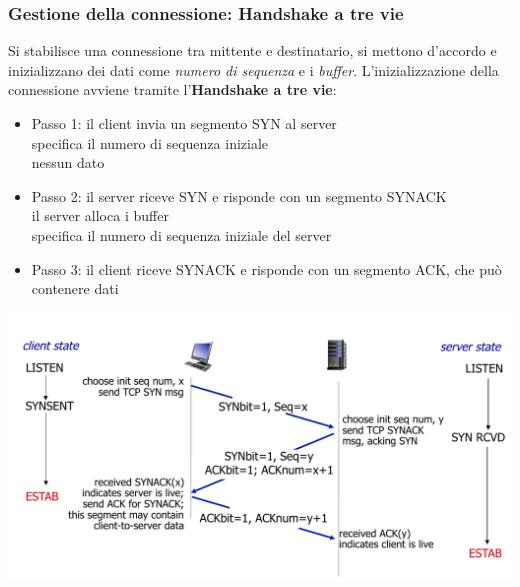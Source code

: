 \subsubsection*{Gestione della connessione: Handshake a tre vie}
Si stabilisce una connessione tra mittente e destinatario, si mettono d'accordo e inizializzano dei dati come \textit{numero di sequenza} e i \textit{buffer}. 
L'inizializzazione della connessione avviene tramite l'\textbf{Handshake a tre vie}:
\begin{itemize}
  \item Passo 1: il client invia un segmento SYN al server \\
      specifica il numero di sequenza iniziale \\ 
      nessun dato
  \item Passo 2:  il server riceve SYN e risponde con un segmento SYNACK \\
      il server alloca i buffer \\
      specifica il numero di sequenza iniziale del server
  \item Passo 3:  il client riceve SYNACK e risponde con un segmento ACK, che può contenere dati
\end{itemize}
\includegraphics[width=\textwidth]{./img/handshake3vie.png} \\ 

